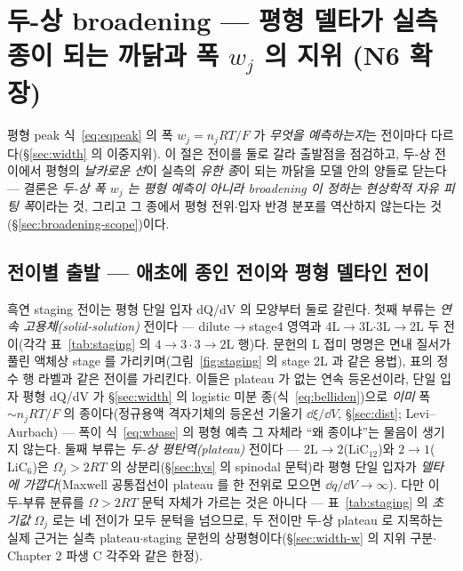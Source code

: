 \section{두-상 broadening --- 평형 델타가 실측 종이 되는 까닭과 폭 $w_j$ 의 지위 (N6 확장)}\label{sec:broadening}
평형 peak 식~\eqref{eq:eqpeak} 의 폭 $w_j=n_jRT/F$ 가 \emph{무엇을 예측하는지}는 전이마다 다르다(\S\ref{sec:width}
의 이중지위). 이 절은
전이를 둘로 갈라 출발점을 점검하고, 두-상 전이에서 평형의 \emph{날카로운 선}이 실측의 \emph{유한 종}이 되는
까닭을 모델 안의 양들로 닫는다 --- 결론은 \emph{두-상 폭 $w_j$ 는 평형 예측이 아니라 broadening 이 정하는
현상학적 자유 피팅 폭}이라는 것, 그리고 그 종에서 평형 전위$\cdot$입자 반경 분포를 역산하지 않는다는
것(\S\ref{sec:broadening-scope})이다.

\subsection{전이별 출발 --- 애초에 종인 전이와 평형 델타인 전이}\label{sec:broadening-class}
흑연 staging 전이는 평형 단일 입자 dQ/dV 의 모양부터
둘로 갈린다. 첫째 부류는 \emph{연속 고용체(solid-solution)} 전이다 --- dilute$\to$stage4 영역과
4L$\to$3L$\cdot$3L$\to$2L 두 전이(각각 표~\ref{tab:staging} 의 $4\!\to\!3\cdot3\!\to\!2\mathrm L$ 행)다. 문헌의 L 접미 명명은 면내 질서가 풀린
액체상 stage 를 가리키며(그림~\ref{fig:staging} 의 stage 2L 과 같은 용법), 표의 정수 행 라벨과 같은 전이를
가리킨다. 이들은 plateau 가 없는 연속 등온선이라\cite{rsc2021}, 단일 입자 평형 dQ/dV 가 \S\ref{sec:width} 의 logistic 미분
종(식~\eqref{eq:belliden})으로 \emph{이미} 폭 $\sim n_jRT/F$ 의 종이다(정규용액 격자기체의 등온선 기울기
$\dd\xi/\dd V$, \S\ref{sec:dist}; Levi--Aurbach\cite{leviaurbach1999}) --- 폭이 식~\eqref{eq:wbase} 의 평형
예측 그 자체라 ``왜 종이냐''는 물음이 생기지 않는다. 둘째 부류는 \emph{두-상 평탄역(plateau)} 전이다 ---
$2\mathrm L\!\to\!2$($\mathrm{LiC_{12}}$)와 $2\!\to\!1$($\mathrm{LiC_6}$)은 $\Omega_j>2RT$ 의 상분리(\S\ref{sec:hys}
의 spinodal 문턱)라 평형 단일 입자가 \emph{델타에 가깝다}(Maxwell 공통접선이 plateau 를 한 전위로 모으면
$\dd q/\dd V\!\to\!\infty$). 다만 이 두-부류 분류를 $\Omega>2RT$ 문턱 자체가 가르는 것은 아니다 ---
표~\ref{tab:staging} 의 \emph{초기값} $\Omega_j$ 로는 네 전이가 모두 문턱을 넘으므로, 두 전이만 두-상
plateau 로 지목하는 실제 근거는 실측 plateau$\cdot$staging 문헌의 상평형이다(\S\ref{sec:width-w} 의
지위 구분$\cdot$Chapter 2 파생 C 각주와 같은 한정).


